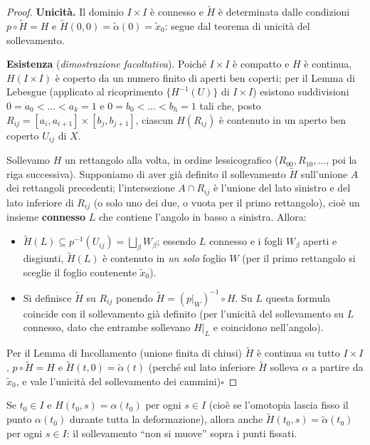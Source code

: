 \begin{proof}
\textbf{Unicit\`a.} Il dominio $I \times I$ \`e connesso e $\widetilde{H}$ \`e determinata dalle condizioni $p \circ \widetilde{H} = H$ e $\widetilde{H}(0,0) = \widetilde{\alpha}(0) = \widetilde{x}_0$: segue dal teorema di unicit\`a del sollevamento.

\textbf{Esistenza} (\emph{dimostrazione facoltativa}). Poich\'e $I \times I$ \`e compatto e $H$ \`e continua, $H(I \times I)$ \`e coperto da un numero finito di aperti ben coperti; per il Lemma di Lebesgue (applicato al ricoprimento $\{H^{-1}(U)\}$ di $I \times I$) esistono suddivisioni $0 = a_0 < \dots < a_k = 1$ e $0 = b_0 < \dots < b_h = 1$ tali che, posto $R_{ij} = [a_{i}, a_{i+1}] \times [b_j, b_{j+1}]$, ciascun $H(R_{ij})$ \`e contenuto in un aperto ben coperto $U_{ij}$ di $X$.

Sollevamo $H$ un rettangolo alla volta, in ordine lessicografico ($R_{00}, R_{10}, \dots$, poi la riga successiva). Supponiamo di aver gi\`a definito il sollevamento $\widetilde{H}$ sull'unione $A$ dei rettangoli precedenti; l'intersezione $A \cap R_{ij}$ \`e l'unione del lato sinistro e del lato inferiore di $R_{ij}$ (o solo uno dei due, o vuota per il primo rettangolo), cio\`e un insieme \textbf{connesso} $L$ che contiene l'angolo in basso a sinistra. Allora:
\begin{itemize}
    \item $\widetilde{H}(L) \subseteq p^{-1}(U_{ij}) = \bigsqcup_\beta W_\beta$; essendo $L$ connesso e i fogli $W_\beta$ aperti e disgiunti, $\widetilde{H}(L)$ \`e contenuto in \emph{un solo} foglio $W$ (per il primo rettangolo si sceglie il foglio contenente $\widetilde{x}_0$).
    \item Si definisce $\widetilde{H}$ su $R_{ij}$ ponendo $\widetilde{H} = (p|_W)^{-1} \circ H$. Su $L$ questa formula coincide con il sollevamento gi\`a definito (per l'unicit\`a del sollevamento su $L$ connesso, dato che entrambe sollevano $H|_L$ e coincidono nell'angolo).
\end{itemize}
Per il Lemma di Incollamento (unione finita di chiusi) $\widetilde{H}$ \`e continua su tutto $I \times I$, $p \circ \widetilde{H} = H$ e $\widetilde{H}(t,0) = \widetilde{\alpha}(t)$ (perch\'e sul lato inferiore $\widetilde{H}$ solleva $\alpha$ a partire da $\widetilde{x}_0$, e vale l'unicit\`a del sollevamento dei cammini)\hfill$\square$
\end{proof}

\begin{observacion}[Importante]
Se $t_0 \in I$ e $H(t_0, s) = \alpha(t_0)$ per ogni $s \in I$ (cio\`e se l'omotopia lascia fisso il punto $\alpha(t_0)$ durante tutta la deformazione), allora anche $\widetilde{H}(t_0, s) = \widetilde{\alpha}(t_0)$ per ogni $s \in I$: il sollevamento ``non si muove'' sopra i punti fissati.
\end{observacion}

